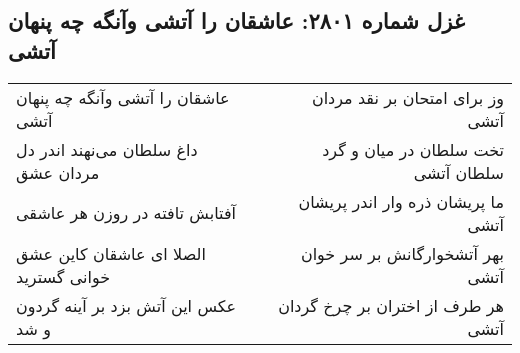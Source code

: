 \begin{center}
\section*{غزل شماره ۲۸۰۱: عاشقان را آتشی وآنگه چه پنهان آتشی}
\label{sec:2801}
\begin{longtable}{l p{0.5cm} r}
عاشقان را آتشی وآنگه چه پنهان آتشی
&&
وز برای امتحان بر نقد مردان آتشی
\\
داغ سلطان می‌نهند اندر دل مردان عشق
&&
تخت سلطان در میان و گرد سلطان آتشی
\\
آفتابش تافته در روزن هر عاشقی
&&
ما پریشان ذره وار اندر پریشان آتشی
\\
الصلا ای عاشقان کاین عشق خوانی گسترید
&&
بهر آتشخوارگانش بر سر خوان آتشی
\\
عکس این آتش بزد بر آینه گردون و شد
&&
هر طرف از اختران بر چرخ گردان آتشی
\\
\end{longtable}
\end{center}
